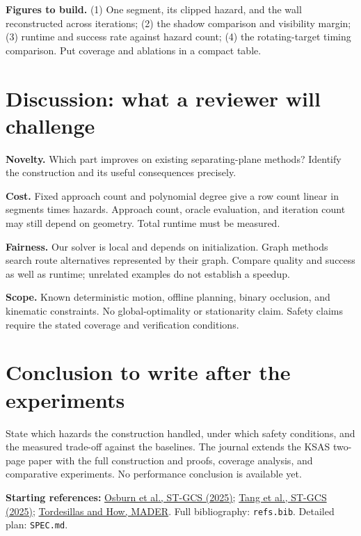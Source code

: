 \documentclass[11pt]{article}
\begin{document}
\textbf{Figures to build.} (1) One segment, its clipped hazard, and the wall
reconstructed across iterations; (2) the shadow comparison and visibility margin;
(3) runtime and success rate against hazard count; (4) the rotating-target timing
comparison. Put coverage and ablations in a compact table.

\section{Discussion: what a reviewer will challenge}
\textbf{Novelty.} Which part improves on existing separating-plane methods?
Identify the construction and its useful consequences precisely.

\textbf{Cost.} Fixed approach count and polynomial degree give a row count linear
in segments times hazards. Approach count, oracle evaluation, and iteration count
may still depend on geometry. Total runtime must be measured.

\textbf{Fairness.} Our solver is local and depends on initialization. Graph
methods search route alternatives represented by their graph. Compare quality
and success as well as runtime; unrelated examples do not establish a speedup.

\textbf{Scope.} Known deterministic motion, offline planning, binary occlusion,
and kinematic constraints. No global-optimality or stationarity claim. Safety
claims require the stated coverage and verification conditions.

\section{Conclusion to write after the experiments}
State which hazards the construction handled, under which safety conditions,
and the measured trade-off against the baselines. The journal extends the KSAS
two-page paper with the full construction and proofs, coverage analysis, and
comparative experiments. No performance conclusion is available yet.

\smallskip
{\small\textbf{Starting references:}
\href{https://arxiv.org/abs/2508.10203}{Osburn et al., ST-GCS (2025)};
\href{https://arxiv.org/abs/2503.00583}{Tang et al., ST-GCS (2025)};
\href{https://arxiv.org/abs/2010.11061}{Tordesillas and How, MADER}.
Full bibliography: \texttt{refs.bib}. Detailed plan: \texttt{SPEC.md}.}
\end{document}
